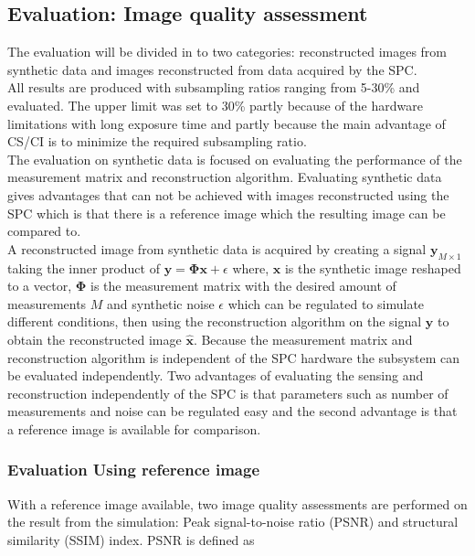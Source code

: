 \subsection{Evaluation: Image quality assessment}
\label{sec:method_eval}
The evaluation will be divided in to two categories: reconstructed images from synthetic data and images reconstructed from data acquired by the SPC.\\[0.1in] 

All results are produced with subsampling ratios ranging from 5-30\% and evaluated. The upper limit was set to 30\% partly because of the hardware limitations with long exposure time and partly because the main advantage of CS/CI is to minimize the required subsampling ratio.\\[0.1in]

The evaluation on synthetic data is focused on evaluating the performance of the measurement matrix and reconstruction algorithm. Evaluating synthetic data gives advantages that can not be achieved with images reconstructed using the SPC which is that there is a reference image which the resulting image can be compared to.\\[0.1in]

A reconstructed image from synthetic data is acquired by creating a signal $ \mathbf{ y }_{M\times1}$ taking the inner product of $ \mathbf{y} = \mathbf{\Phi} \mathbf{x} + \epsilon$ where, $\mathbf{x}$ is the synthetic image reshaped to a vector, $\mathbf{\Phi}$ is the measurement matrix with the desired amount of measurements $M$ and synthetic noise $\epsilon$ which can be regulated to simulate different conditions, then using the reconstruction algorithm on the signal $\mathbf{y}$ to obtain the reconstructed image $\mathbf{\hat x}$. Because the measurement matrix and reconstruction algorithm is independent of the SPC hardware the subsystem can be evaluated independently. Two advantages of evaluating the sensing and reconstruction independently of the SPC is that parameters such as number of measurements and noise can be regulated easy and the second advantage is that a reference image is available for comparison.\\[0.1in] 

\subsubsection{Evaluation Using reference image}
With a reference image available, two image quality assessments are performed on the result from the simulation: Peak signal-to-noise ratio (PSNR) and structural similarity (SSIM) index. PSNR is defined as

